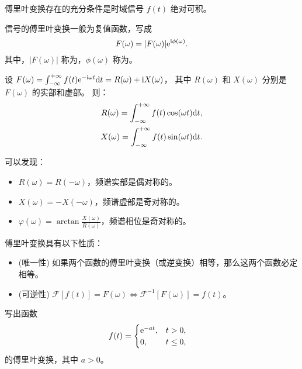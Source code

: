 \begin{theorem}
    傅里叶变换存在的充分条件是时域信号 $f(t)$ 绝对可积。
\end{theorem}

\begin{definition}[傅里叶频谱]
    信号的傅里叶变换一般为复值函数，写成
    \begin{equation}
        F(\omega) = |F(\omega)|\mathrm{e}^{\mathrm{i}\phi(\omega)}.
    \end{equation}
    其中，$|F(\omega)|$ 称为，$\phi(\omega)$ 称为。
\end{definition}

\begin{example}
    设 $F(\omega) = \int_{-\infty}^{+\infty}f(t)\mathrm{e}^{-\mathrm{i} \omega t}\mathrm{d}t = R(\omega) + \mathrm{i} X(\omega)$，
    其中 $R(\omega)$ 和 $X(\omega)$ 分别是 $F(\omega)$ 的实部和虚部。
    则：
    \begin{align*}
        R(\omega) = \int_{-\infty}^{+\infty} f(t)\cos(\omega t)\mathrm{d}t, \\
        X(\omega) = \int_{-\infty}^{+\infty} f(t)\sin(\omega t)\mathrm{d}t.
    \end{align*}

    可以发现：
    \begin{itemize}
        \item $R(\omega) = R(-\omega)$，频谱实部是偶对称的。
        \item $X(\omega) = -X(-\omega)$，频谱虚部是奇对称的。
        \item $\varphi(\omega) = \arctan\frac{X(\omega)}{R(\omega)}$，频谱相位是奇对称的。
    \end{itemize}
\end{example}

\begin{property}[傅里叶变换的性质]
    傅里叶变换具有以下性质：
    \begin{itemize}
        \item (唯一性) 如果两个函数的傅里叶变换（或逆变换）相等，那么这两个函数必定相等。
        \item (可逆性) $\mathcal{F}[f(t)] = F(\omega) \iff \mathcal{F}^{-1}[F(\omega)] = f(t)$。
    \end{itemize}
\end{property}

\begin{exercise}
    写出函数
    \begin{align*}
        f(t) &= \begin{cases}
            \mathrm{e}^{-at}, & t > 0, \\
            0, & t \leq 0,
        \end{cases}
    \end{align*}
    的傅里叶变换，其中 $a > 0$。
\end{exercise}

